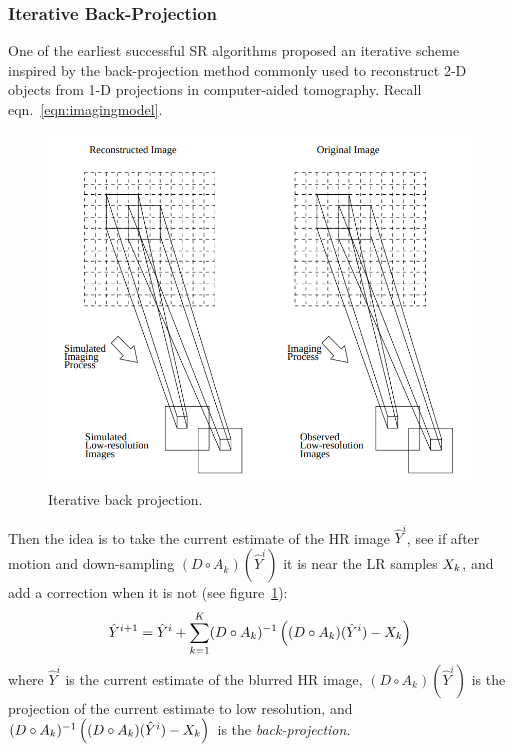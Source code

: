 \subsubsection{Iterative Back-Projection}\label{subsubsec:iterback}
One of the earliest successful SR algorithms\cite{Irani1991ImprovingRB} proposed an iterative scheme inspired by the back-projection method commonly used to reconstruct 2-D objects from 1-D projections in computer-aided tomography.
%
Recall eqn.~\eqref{eqn:imagingmodel}.
\begin{figure}
    \centering
    \includegraphics[width=\linewidth,keepaspectratio]{figures/classical/iterative_back_projection.png}
    \caption{Iterative back projection\cite{Irani1991ImprovingRB}.}
    \label{fig:iterbackproj}
\end{figure}
%
Then the idea is to take the current estimate of the HR image \(\hat{Y}^{i}\), see if after motion and down-sampling \((D \circ A_k)(\hat{Y}^i)\) it is near the LR samples \(X_k\), and add a correction when it is not (see figure~\ref{fig:iterbackproj}):
\begin{equation}
    \hat{Y}^{i+1} = \hat{Y}^i + \sum_{k=1}^K (D \circ A_k)^{-1}\left( (D \circ A_k)(\hat{Y}^i) - X_k \right)
    \label{eqn:ibp}
\end{equation}
where \(\hat{Y}^i\) is the current estimate of the blurred HR image, \((D \circ A_k)(\hat{Y}^i)\) is the projection of the current estimate to low resolution, and \((D \circ A_k)^{-1}\left( (D \circ A_k)(\hat{Y}^i) - X_k \right)\) is the \textit{back-projection}.
